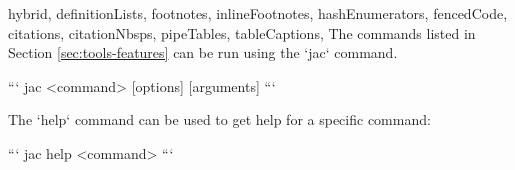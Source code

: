 \begin{markdown*}{%
  hybrid,
  definitionLists,
  footnotes,
  inlineFootnotes,
  hashEnumerators,
  fencedCode,
  citations,
  citationNbsps,
  pipeTables,
  tableCaptions,
}
The commands listed in Section \ref{sec:tools-features} can be run using the `jac` command.

```
jac <command> [options] [arguments]
```

The `help` command can be used to get help for a specific command:

```
jac help <command>
```


\end{markdown*}
